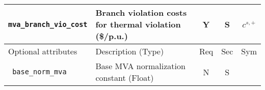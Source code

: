 \documentclass{article}
\newcounter{todo}[section] \setcounter{todo}{0}
\renewcommand{\thetodo}{\arabic{section}.\arabic{todo}}
\newenvironment{todo}[2][]{%
\refstepcounter{todo}%
\ifstrempty{#1}%
{\mdfsetup{%
frametitle={%
\tikz[baseline=(current bounding box.east),outer sep=0pt]
\node[anchor=east,rectangle,fill=red!20]
{\strut To Be Discussed~\thetodo};}}
}%
{\mdfsetup{%
frametitle={%
\tikz[baseline=(current bounding box.east),outer sep=0pt]
\node[anchor=east,rectangle,fill=red!20]
{\strut To Be Discussed~\thetodo:~#1};}}%
}%
\mdfsetup{innertopmargin=10pt,linecolor=red!20,%
linewidth=2pt,topline=true,%
frametitleaboveskip=\dimexpr-\ht\strutbox\relax
}
\begin{mdframed}[]\relax%
\label{#2}}{\end{mdframed}}
\begin{document}
\begin{center}
\begin{tabular}{ l | l | c | c | c |}
  {\tt mva\_branch\_vio\_cost} & Branch violation costs for thermal violation (\$/p.u.)  & Y & S &$c^{s,+}$  \\
\hline
Optional attributes & Description (Type) & Req & Sec & Sym\\
\hline  
{\tt\color{red} base\_norm\_mva} & Base MVA normalization constant (Float)  & N & S &  \\
  \hline
\end{tabular}
\end{center}

\end{document}
